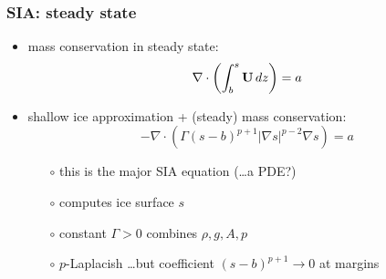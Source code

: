 \documentclass{beamer}
\newcommand{\Div}{\nabla\cdot}
\begin{document}
\begin{frame}
  \frametitle{SIA: steady state}

\begin{itemize}
\item mass conservation in steady state: 
  $$\Div \left(  \int_b^s {\bf U}\, dz \right)  =  a$$
\item shallow ice approximation + (steady) mass conservation:
  $$- \Div \left(\Gamma (s-b)^{p+1} | \nabla s |^{p-2} \nabla s  \right) =  a$$
  \begin{itemize}
  \vspace{-0.2in}
  \item[$\circ$] this is the major SIA equation (\dots a PDE?)
  \item[$\circ$] computes ice surface $s$
  \item[$\circ$] constant $\Gamma > 0$ combines $\rho,g,A,p$
  \item[$\circ$] $p$-Laplacish \dots but coefficient $(s-b)^{p+1} \to 0$ at margins
  \end{itemize}
\end{itemize}
\end{frame}
\end{document}
